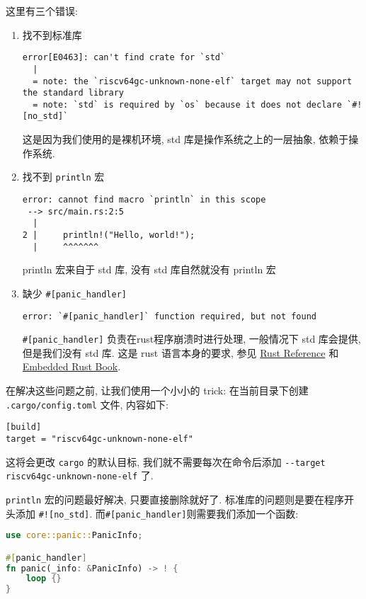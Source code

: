 \documentclass{ctexart}
\begin{document}
这里有三个错误:
\begin{enumerate}
    \item{找不到标准库}
        \begin{lstlisting}
error[E0463]: can't find crate for `std`
  |
  = note: the `riscv64gc-unknown-none-elf` target may not support the standard library
  = note: `std` is required by `os` because it does not declare `#![no_std]`
        \end{lstlisting}
        这是因为我们使用的是裸机环境,
        std 库是操作系统之上的一层抽象,
        依赖于操作系统.
    \item{找不到 \verb|println| 宏}
        \begin{lstlisting}
error: cannot find macro `println` in this scope
 --> src/main.rs:2:5
  |
2 |     println!("Hello, world!");
  |     ^^^^^^^
        \end{lstlisting}
        println 宏来自于 std 库,
        没有 std 库自然就没有 println 宏
    \item 缺少 \verb|#[panic_handler]|
        \begin{lstlisting}
error: `#[panic_handler]` function required, but not found
        \end{lstlisting}
        \verb|#[panic_handler]| 负责在rust程序崩溃时进行处理,
        一般情况下 std 库会提供, 但是我们没有 std 库.
        这是 rust 语言本身的要求, 参见
        \href{https://doc.rust-lang.org/reference/panic.html\#the-panic\_handler-attribute}{Rust Reference}
        和
        \href{https://docs.rust-embedded.org/book/start/panicking.html}{Embedded Rust Book}.
\end{enumerate}

在解决这些问题之前, 让我们使用一个小小的 trick:
在当前目录下创建 \verb|.cargo/config.toml| 文件, 内容如下:
\begin{lstlisting}
[build]
target = "riscv64gc-unknown-none-elf"
\end{lstlisting}
这将会更改 \verb|cargo| 的默认目标,
我们就不需要每次在命令后添加
\texttt{-{}-target riscv64gc-unknown-none-elf} 了.

\verb|println| 宏的问题最好解决, 只要直接删除就好了.
标准库的问题则是要在程序开头添加 \verb|#![no_std]|.
而\verb|#[panic_handler]|则需要我们添加一个函数:
\begin{lstlisting}[language=Rust]
use core::panic::PanicInfo;

#[panic_handler]
fn panic(_info: &PanicInfo) -> ! {
    loop {}
}
\end{lstlisting}
\end{document}

